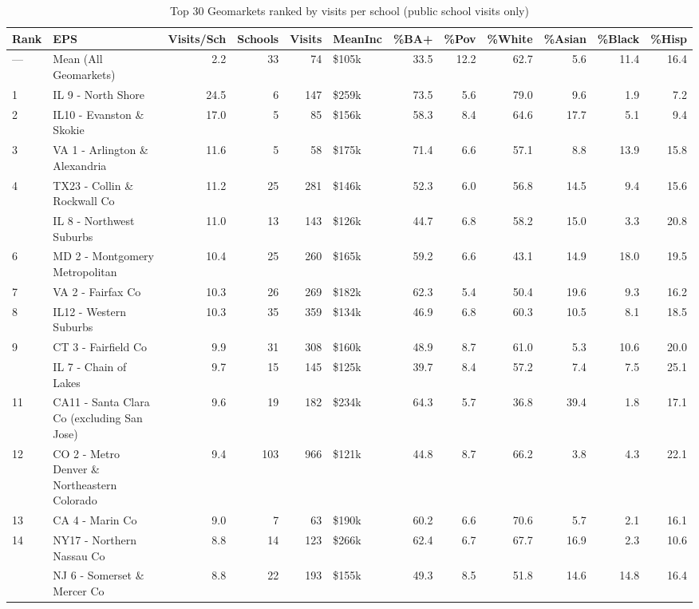 \begin{table}
\centering
\caption{Top 30 Geomarkets ranked by visits per school (public school visits only)}
\centering
\begin{tabular}[t]{llrrrlrrrrrr}
\toprule
Rank & EPS & Visits/Sch & Schools & Visits & MeanInc & \%BA+ & \%Pov & \%White & \%Asian & \%Black & \%Hisp\\
\midrule
— & Mean (All Geomarkets) & 2.2 & 33 & 74 & \$105k & 33.5 & 12.2 & 62.7 & 5.6 & 11.4 & 16.4\\
1 & IL 9 - North Shore & 24.5 & 6 & 147 & \$259k & 73.5 & 5.6 & 79.0 & 9.6 & 1.9 & 7.2\\
2 & IL10 - Evanston \& Skokie & 17.0 & 5 & 85 & \$156k & 58.3 & 8.4 & 64.6 & 17.7 & 5.1 & 9.4\\
3 & VA 1 - Arlington \& Alexandria & 11.6 & 5 & 58 & \$175k & 71.4 & 6.6 & 57.1 & 8.8 & 13.9 & 15.8\\
4 & TX23 - Collin \& Rockwall Co & 11.2 & 25 & 281 & \$146k & 52.3 & 6.0 & 56.8 & 14.5 & 9.4 & 15.6\\
\addlinespace
5 & IL 8 - Northwest Suburbs & 11.0 & 13 & 143 & \$126k & 44.7 & 6.8 & 58.2 & 15.0 & 3.3 & 20.8\\
6 & MD 2 - Montgomery Metropolitan & 10.4 & 25 & 260 & \$165k & 59.2 & 6.6 & 43.1 & 14.9 & 18.0 & 19.5\\
7 & VA 2 - Fairfax Co & 10.3 & 26 & 269 & \$182k & 62.3 & 5.4 & 50.4 & 19.6 & 9.3 & 16.2\\
8 & IL12 - Western Suburbs & 10.3 & 35 & 359 & \$134k & 46.9 & 6.8 & 60.3 & 10.5 & 8.1 & 18.5\\
9 & CT 3 - Fairfield Co & 9.9 & 31 & 308 & \$160k & 48.9 & 8.7 & 61.0 & 5.3 & 10.6 & 20.0\\
\addlinespace
10 & IL 7 - Chain of Lakes & 9.7 & 15 & 145 & \$125k & 39.7 & 8.4 & 57.2 & 7.4 & 7.5 & 25.1\\
11 & CA11 - Santa Clara Co (excluding San Jose) & 9.6 & 19 & 182 & \$234k & 64.3 & 5.7 & 36.8 & 39.4 & 1.8 & 17.1\\
12 & CO 2 - Metro Denver \& Northeastern Colorado & 9.4 & 103 & 966 & \$121k & 44.8 & 8.7 & 66.2 & 3.8 & 4.3 & 22.1\\
13 & CA 4 - Marin Co & 9.0 & 7 & 63 & \$190k & 60.2 & 6.6 & 70.6 & 5.7 & 2.1 & 16.1\\
14 & NY17 - Northern Nassau Co & 8.8 & 14 & 123 & \$266k & 62.4 & 6.7 & 67.7 & 16.9 & 2.3 & 10.6\\
\addlinespace
15 & NJ 6 - Somerset \& Mercer Co & 8.8 & 22 & 193 & \$155k & 49.3 & 8.5 & 51.8 & 14.6 & 14.8 & 16.4\\

\end{tabular}
\end{table}
